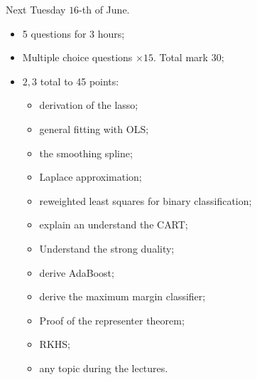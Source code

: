 \documentclass[a4paper]{article}
\begin{document}
Next Tuesday $16$-th of June.
\begin{itemize}
	\item 5 questions for 3 hours;
	\item Multiple choice questions $\times 15$. Total mark $30$;
	\item $2,3$ total to 45 points: \begin{itemize}
		\item derivation of the lasso;
		\item general fitting with OLS;
		\item the smoothing spline;
		\item Laplace approximation;
		\item reweighted least squares for binary classification;
		\item explain an understand the CART;
		\item Understand the strong duality;
		\item derive AdaBoost;
		\item derive the maximum margin classifier;
		\item Proof of the representer theorem;
		\item RKHS;
	\end{itemize}
	\begin{itemize}
		\item any topic during the lectures.
	\end{itemize}
\end{itemize}

\end{document}
